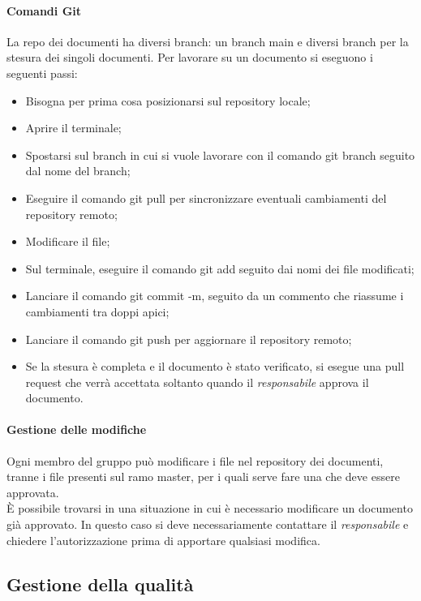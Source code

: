 \documentclass[../norme_di_progetto.tex]{subfiles}
\begin{document}
\paragraph{Comandi Git}
La repo dei documenti ha diversi branch: un branch main e diversi branch per la stesura dei singoli documenti. Per lavorare su un documento si eseguono i seguenti passi:
\begin{itemize}
    \item Bisogna per prima cosa posizionarsi sul repository locale;
    \item Aprire il terminale;
    \item Spostarsi sul branch in cui si vuole lavorare con il comando git branch seguito dal nome del branch;
    \item Eseguire il comando git pull per sincronizzare eventuali cambiamenti del repository remoto;
    \item Modificare il file;
    \item Sul terminale, eseguire il comando git add seguito dai nomi dei file modificati;
    \item Lanciare il comando git commit -m, seguito da un commento che riassume i cambiamenti tra doppi apici;
    \item Lanciare il comando git push per aggiornare il repository remoto;
    \item Se la stesura è completa e il documento è stato verificato, si esegue una pull request che verrà accettata soltanto quando il \emph{responsabile} approva il documento.
\end{itemize}

\paragraph{Gestione delle modifiche}
Ogni membro del gruppo può modificare i file nel repository dei documenti, tranne i file presenti sul ramo master, per i quali serve fare una  che deve essere approvata.\\
È possibile trovarsi in una situazione in cui è necessario modificare un documento già approvato. In questo caso si deve necessariamente contattare il \emph{responsabile} e chiedere l'autorizzazione prima di apportare qualsiasi modifica.

\subsection{Gestione della qualità}
\end{document}
